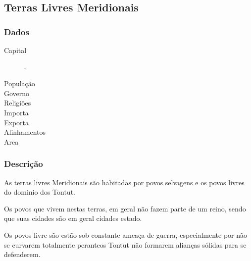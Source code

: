 \subsection{Terras Livres Meridionais}
\subsubsection{Dados}
  \begin{description}
   \item[Capital] - 
   \item[Popula\c{c}\~ao]
   \item[Governo]
   \item[Religi\~oes]
   \item[Importa]
   \item[Exporta]
   \item[Alinhamentos]
   \item[Area]
  \end{description}
\subsubsection{Descri\c{c}\~ao}
As terras livres Meridionais s\~ao habitadas por
povos selvagens e os povos livres do dominio dos Tontut.

Os povos que vivem nestas terras, em geral n\~ao fazem parte de um
reino, sendo que suas cidades s\~ao em geral cidades estado.

Os povos livre s\~ao est\~ao sob constante amea\c{c}a de guerra, especialmente
por n\~ao se curvarem totalmente  peranteos Tontut n\~ao formarem alian\c{c}as
s\'olidas para se defenderem.

